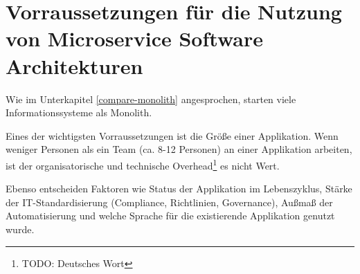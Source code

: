 \newpage
\section{Vorraussetzungen für die Nutzung von Microservice Software Architekturen} \label{wann-msa}

Wie im Unterkapitel \ref{compare-monolith} angesprochen, starten viele
Informationssysteme als Monolith.

Eines der wichtigsten Vorraussetzungen ist die Größe einer Applikation. Wenn
weniger Personen als ein Team (ca. 8-12 Personen) an einer Applikation arbeiten,
ist der organisatorische und technische Overhead\footnote{TODO: Deutsches Wort}
es nicht Wert.

Ebenso entscheiden Faktoren wie Status der Applikation im Lebenszyklus, Stärke
der IT-Standardisierung (Compliance, Richtlinien, Governance), Außmaß der
Automatisierung und welche Sprache für die existierende Applikation genutzt wurde.

